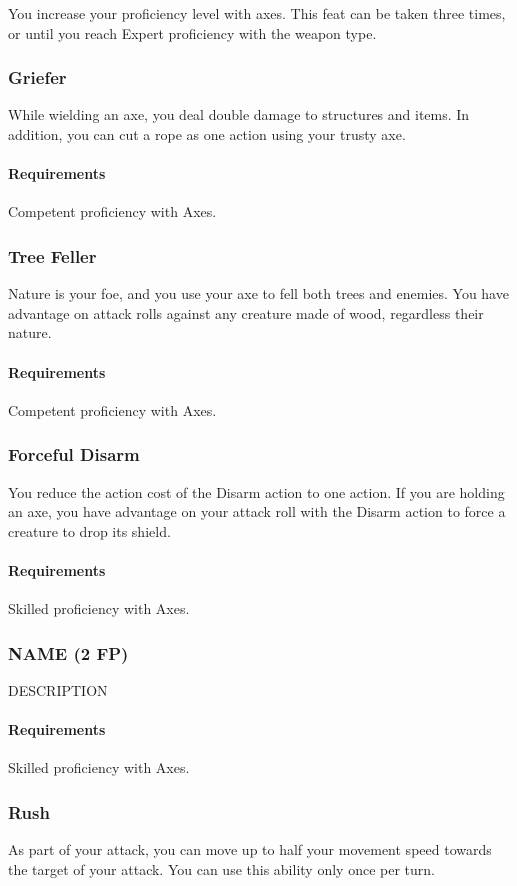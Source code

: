     You increase your proficiency level with axes.
    This feat can be taken three times, or until you reach Expert proficiency with the weapon type.
\subsubsection{Griefer} \label{feat::griefer}
    While wielding an axe, you deal double damage to structures and items.
    In addition, you can cut a rope as one action using your trusty axe.
    \paragraph{Requirements} Competent proficiency with Axes.
\subsubsection{Tree Feller} \label{feat::treefeller}
    Nature is your foe, and you use your axe to fell both trees and enemies.
    You have advantage on attack rolls against any creature made of wood, regardless their nature.
    \paragraph{Requirements} Competent proficiency with Axes.
\subsubsection{Forceful Disarm} \label{feat::forcefuldisarm}
    You reduce the action cost of the Disarm action to one action.
    If you are holding an axe, you have advantage on your attack roll with the Disarm action to force a creature to drop its shield.
    \paragraph{Requirements} Skilled proficiency with Axes.
\subsubsection{NAME (2 FP)} \label{feat::name}
    DESCRIPTION
    \paragraph{Requirements} Skilled proficiency with Axes.
\subsubsection{Rush} \label{feat::rush}
    As part of your attack, you can move up to half your movement speed towards the target of your attack.
    You can use this ability only once per turn.
